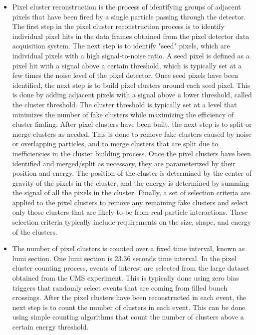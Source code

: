 \begin{itemize}
\item Pixel cluster reconstruction is the process of identifying groups of adjacent pixels that have been fired by a single particle passing through the detector. The first step in the pixel cluster reconstruction process is to identify individual pixel hits in the data frames obtained from the pixel detector data acquisition system. %
The next step is to identify "seed" pixels, which are individual pixels with a high signal-to-noise ratio. A seed pixel is defined as a pixel hit with a signal above a certain threshold, which is typically set at a few times the noise level of the pixel detector. Once seed pixels have been identified, the next step is to build pixel clusters around each seed pixel. This is done by adding adjacent pixels with a signal above a lower threshold, called the cluster threshold. The cluster threshold is typically set at a level that minimizes the number of fake clusters while maximizing the efficiency of cluster finding. After pixel clusters have been built, the next step is to split or merge clusters as needed. This is done to remove fake clusters caused by noise or overlapping particles, and to merge clusters that are split due to inefficiencies in the cluster building process. Once the pixel clusters have been identified and merged/split as necessary, they are parameterized by their position and energy. The position of the cluster is determined by the center of gravity of the pixels in the cluster, and the energy is determined by summing the signal of all the pixels in the cluster. Finally, a set of selection criteria are applied to the pixel clusters to remove any remaining fake clusters and select only those clusters that are likely to be from real particle interactions. These selection criteria typically include requirements on the size, shape, and energy of the clusters.

\item The number of pixel clusters is counted over a fixed time interval, known as lumi section. One lumi section is 23.36 seconds time interval. In the pixel cluster counting process, events of interest are selected from the large dataset obtained from the CMS experiment. This is typically done using zero bias triggers that randomly select events that are coming from filled bunch crossings.
  After the pixel clusters have been reconstructed in each event, the next step is to count the number of clusters in each event. This can be done using simple counting algorithms that count the number of clusters above a certain energy threshold. %


\end{itemize}
